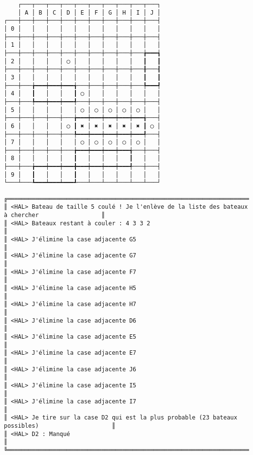 {\scriptsize
\begin{verbatim}
    ┌───┬───┬───┬───┬───┬───┬───┬───┬───┬───┐
    │ A │ B │ C │ D │ E │ F │ G │ H │ I │ J │
┌───┼───┼───┼───┼───┼───┼───┼───┼───┼───┼───┤
│ 0 │   │   │   │   │   │   │   │   │   │   │
├───┼───┼───┼───┼───┼───┼───┼───┼───┼───┼───┤
│ 1 │   │   │   │   │   │   │   │   │   │   │
├───┼───┼───┼───┼───┼───┼───┼───┼───┼───╆━━━┪
│ 2 │   │   │   │ ◯ │   │   │   │   │   ┃   ┃
├───┼───┼───┼───┼───┼───┼───┼───┼───┼───╂───┨
│ 3 │   │   │   │   │   │   │   │   │   ┃   ┃
├───┼───╆━━━┿━━━┿━━━╅───┼───┼───┼───┼───╄━━━┩
│ 4 │   ┃   │   │   ┃ ◯ │   │   │   │   │   │
├───┼───╄━━━┿━━━┿━━━╃───┼───┼───┼───┼───┼───┤
│ 5 │   │   │   │   │ ◯ │ ◯ │ ◯ │ ◯ │ ◯ │   │
├───┼───┼───┼───┼───╆━━━┿━━━┿━━━┿━━━┿━━━╅───┤
│ 6 │   │   │   │ ◯ ┃ ✖ │ ✖ │ ✖ │ ✖ │ ✖ ┃ ◯ │
├───┼───┼───┼───┼───╄━━━┿━━━┿━━━┿━━━┿━━━╃───┤
│ 7 │   │   │   │   │ ◯ │ ◯ │ ◯ │ ◯ │ ◯ │   │
├───┼───┼───┼───┼───╆━━━┿━━━┿━━━┿━━━╅───┼───┤
│ 8 │   │   │   │   ┃   │   │   │   ┃   │   │
├───┼───╆━━━┿━━━┿━━━╋━━━┿━━━┿━━━┿━━━╃───┼───┤
│ 9 │   ┃   │   │   ┃   │   │   │   │   │   │
└───┴───┺━━━┷━━━┷━━━┹───┴───┴───┴───┴───┴───┘

╔══════════════════════════════════════════════════════════════════════════════════════════════════╗
║ <HAL> Bateau de taille 5 coulé ! Je l'enlève de la liste des bateaux à chercher                  ║
║ <HAL> Bateaux restant à couler : 4 3 3 2                                                         ║
║ <HAL> J'élimine la case adjacente G5                                                             ║
║ <HAL> J'élimine la case adjacente G7                                                             ║
║ <HAL> J'élimine la case adjacente F7                                                             ║
║ <HAL> J'élimine la case adjacente H5                                                             ║
║ <HAL> J'élimine la case adjacente H7                                                             ║
║ <HAL> J'élimine la case adjacente D6                                                             ║
║ <HAL> J'élimine la case adjacente E5                                                             ║
║ <HAL> J'élimine la case adjacente E7                                                             ║
║ <HAL> J'élimine la case adjacente J6                                                             ║
║ <HAL> J'élimine la case adjacente I5                                                             ║
║ <HAL> J'élimine la case adjacente I7                                                             ║
║ <HAL> Je tire sur la case D2 qui est la plus probable (23 bateaux possibles)                     ║
║ <HAL> D2 : Manqué                                                                                ║
╚══════════════════════════════════════════════════════════════════════════════════════════════════╝
\end{verbatim}}
\newpage

